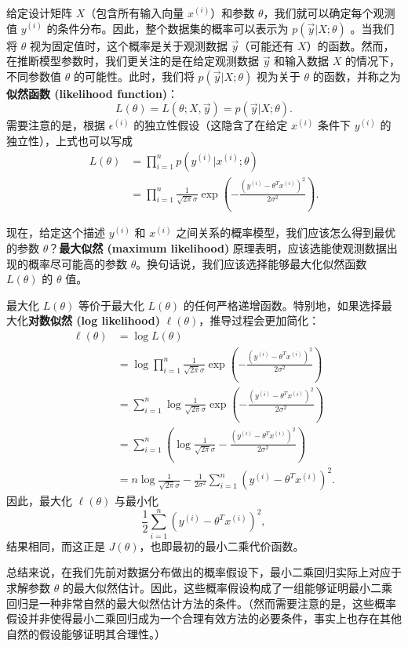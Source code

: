 给定设计矩阵 $X$（包含所有输入向量 $x^{(i)}$）和参数 $\theta$，我们就可以确定每个观测值 $y^{(i)}$ 的条件分布。因此，整个数据集的概率可以表示为 $p(\vec{y} | X; \theta)$ 。当我们将 $\theta$ 视为固定值时，这个概率是关于观测数据 $\vec{y}$（可能还有 $X$）的函数。然而，在推断模型参数时，我们更关注的是在给定观测数据 $\vec{y}$ 和输入数据 $X$ 的情况下，不同参数值 $\theta$ 的可能性。此时，我们将 $p(\vec{y} | X; \theta)$ 视为关于 $\theta$ 的函数，并称之为\textbf{似然函数 (likelihood function)}：
\[
    L(\theta) = L(\theta; X, \vec{y}) = p(\vec{y} | X; \theta).
\]
需要注意的是，根据 $\epsilon^{(i)}$ 的独立性假设（这隐含了在给定 $x^{(i)}$ 条件下 $y^{(i)}$ 的独立性），上式也可以写成
\[
    \begin{aligned}
        L(\theta) &= \prod_{i=1}^n p(y^{(i)} | x^{(i)}; \theta) \\
        &= \prod_{i=1}^n \frac{1}{\sqrt{2\pi}\sigma} \exp\left(-\frac{(y^{(i)} - \theta^T x^{(i)})^2}{2\sigma^2}\right).
    \end{aligned}
\]

现在，给定这个描述 $y^{(i)}$ 和 $x^{(i)}$ 之间关系的概率模型，我们应该怎么得到最优的参数 $\theta$？\textbf{最大似然 (maximum likelihood)} 原理表明，应该选能使观测数据出现的概率尽可能高的参数 $\theta$。换句话说，我们应该选择能够最大化似然函数 $L(\theta)$ 的 $\theta$ 值。

最大化 $L(\theta)$ 等价于最大化 $L(\theta)$ 的任何严格递增函数。特别地，如果选择最大化\textbf{对数似然 (log likelihood)} $\ell(\theta)$，推导过程会更加简化：
\[
    \begin{aligned}
    \ell(\theta) &= \log L(\theta) \\
    &= \log \prod_{i=1}^n \frac{1}{\sqrt{2\pi}\sigma} \exp\left(-\frac{(y^{(i)} - \theta^T x^{(i)})^2}{2\sigma^2}\right) \\
    &= \sum_{i=1}^n \log \frac{1}{\sqrt{2\pi}\sigma} \exp\left(-\frac{(y^{(i)} - \theta^T x^{(i)})^2}{2\sigma^2}\right) \\
    &= \sum_{i=1}^n \left(\log \frac{1}{\sqrt{2\pi}\sigma} - \frac{(y^{(i)} - \theta^T x^{(i)})^2}{2\sigma^2}\right) \\
    &= n \log \frac{1}{\sqrt{2\pi}\sigma} - \frac{1}{2\sigma^2} \sum_{i=1}^n (y^{(i)} - \theta^T x^{(i)})^2.
    \end{aligned}
\]
因此，最大化 $\ell(\theta)$ 与最小化
\[
    \frac{1}{2} \sum_{i=1}^n (y^{(i)} - \theta^T x^{(i)})^2,
\]
结果相同，而这正是 $J(\theta)$，也即最初的最小二乘代价函数。

总结来说，在我们先前对数据分布做出的概率假设下，最小二乘回归实际上对应于求解参数 $\theta$ 的最大似然估计。因此，这些概率假设构成了一组能够证明最小二乘回归是一种非常自然的最大似然估计方法的条件。（然而需要注意的是，这些概率假设并非使得最小二乘回归成为一个合理有效方法的必要条件，事实上也存在其他自然的假设能够证明其合理性。）

